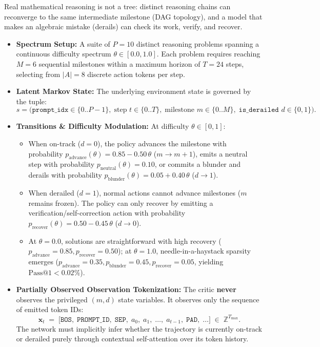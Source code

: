 \documentclass[11pt,a4paper]{article}
\begin{document}
Real mathematical reasoning is not a tree: distinct reasoning chains can reconverge to the same intermediate milestone (DAG topology), and a model that makes an algebraic mistake (derails) can check its work, verify, and recover.
\begin{itemize}[leftmargin=*, itemsep=2.5pt]
    \item \textbf{Spectrum Setup:} A suite of $P = 10$ distinct reasoning problems spanning a continuous difficulty spectrum $\theta \in [0.0, 1.0]$. Each problem requires reaching $M = 6$ sequential milestones within a maximum horizon of $T = 24$ steps, selecting from $|A| = 8$ discrete action tokens per step.
    \item \textbf{Latent Markov State:} The underlying environment state is governed by the tuple:
    \[
        s = \big(\texttt{prompt\_idx} \in \{0..P-1\},\; \text{step } t \in \{0..T\},\; \text{milestone } m \in \{0..M\},\; \texttt{is\_derailed } d \in \{0, 1\}\big).
    \]
    \item \textbf{Transitions \& Difficulty Modulation:} At difficulty $\theta \in [0, 1]$:
    \begin{itemize}[itemsep=1.5pt]
        \item When on-track ($d=0$), the policy advances the milestone with probability $p_{\text{advance}}(\theta) = 0.85 - 0.50\,\theta$ ($m \to m+1$), emits a neutral step with probability $p_{\text{neutral}}(\theta) = 0.10$, or commits a blunder and derails with probability $p_{\text{blunder}}(\theta) = 0.05 + 0.40\,\theta$ ($d \to 1$).
        \item When derailed ($d=1$), normal actions cannot advance milestones ($m$ remains frozen). The policy can only recover by emitting a verification/self-correction action with probability $p_{\text{recover}}(\theta) = 0.50 - 0.45\,\theta$ ($d \to 0$).
        \item At $\theta = 0.0$, solutions are straightforward with high recovery ($p_{\text{advance}}=0.85, p_{\text{recover}}=0.50$); at $\theta = 1.0$, needle-in-a-haystack sparsity emerges ($p_{\text{advance}}=0.35, p_{\text{blunder}}=0.45, p_{\text{recover}}=0.05$, yielding $\text{Pass@1} < 0.02\%$).
    \end{itemize}
    \item \textbf{Partially Observed Observation Tokenization:} The critic \textbf{never} observes the privileged $(m, d)$ state variables. It observes only the sequence of emitted token IDs:
    \[
        \mathbf{x}_t \;=\; \big[\texttt{BOS},\; \texttt{PROMPT\_ID},\; \texttt{SEP},\; a_0,\; a_1,\; \dots,\; a_{t-1},\; \texttt{PAD},\; \dots\big] \;\in\; \mathbb{Z}^{T_{\text{max}}}.
    \]
    The network must implicitly infer whether the trajectory is currently on-track or derailed purely through contextual self-attention over its token history.
\end{itemize}
\end{document}

